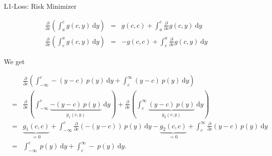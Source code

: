 \documentclass[11pt,compress,t,notes=noshow, xcolor=table]{beamer}
\begin{document}
\begin{vbframe}{L1-Loss: Risk Minimizer}
\begin{footnotesize}
\begin{eqnarray*}
  \frac{\partial}{\partial c} \left(\int_a^c g(c, y) ~\text{d}y\right) &=& g(c, c) + \int_a^c \frac{\partial}{\partial c} g(c, y) ~\text{d}y \\
  \frac{\partial}{\partial c} \left(\int_c^a g(c, y) ~\text{d}y\right) &=& - g(c, c) + \int_c^a \frac{\partial}{\partial c} g(c, y) ~\text{d}y    
\end{eqnarray*}

We get 

\vspace*{-0.3cm}

\begin{eqnarray*}
&&\frac{\partial}{\partial c} \left(\int_{-\infty}^c -(y - c)~p(y)~\text{d}y + \int_c^\infty (y - c)~p(y)~\text{d}y \right) \\
&=& \frac{\partial}{\partial c} \left(\int_{-\infty}^c \underbrace{-(y - c)~p(y)}_{g_1(c, y)}~\text{d}y\right) + \frac{\partial}{\partial c} \left(\int_c^\infty \underbrace{(y - c)~p(y)}_{g_2(c, y)}~\text{d}y \right) \\
&=& \underbrace{g_1(c, c)}_{=0} + \int_{-\infty}^c \frac{\partial}{\partial c}  \left(-(y - c)\right)~p(y)~\text{d}y - \underbrace{g_2(c, c)}_{= 0} + \int_c^\infty \frac{\partial}{\partial c}  (y - c)~p(y)~\text{d}y \\
&=& \int_{-\infty}^c  ~p(y)~\text{d}y + \int_c^\infty -~p(y)~\text{d}y. 
\end{eqnarray*}

\end{footnotesize}

\end{vbframe}
\end{document}

